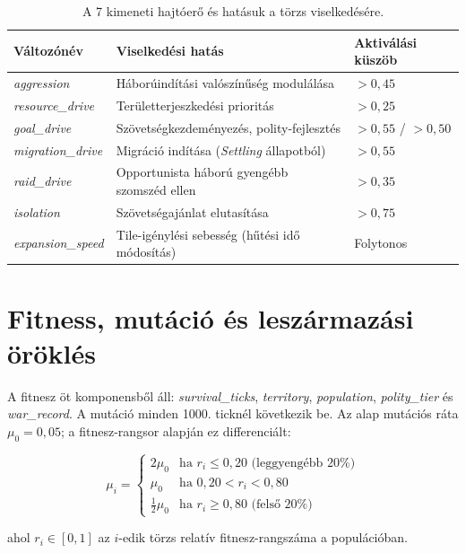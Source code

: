 \begin{table}[h]
  \centering
  \caption{A 7 kimeneti hajtóerő és hatásuk a törzs viselkedésére.}
  \label{tab:neurosim-outputs}
  \begin{tabular}{|l|l|l|}
    \hline
    \textbf{Változónév} & \textbf{Viselkedési hatás} & \textbf{Aktiválási küszöb} \\
    \hline
    \textit{aggression}      & Háborúindítási valószínűség modulálása       & $> 0{,}45$ \\
    \textit{resource\_drive} & Területterjeszkedési prioritás                & $> 0{,}25$ \\
    \textit{goal\_drive}     & Szövetségkezdeményezés, polity-fejlesztés     & $> 0{,}55$ / $> 0{,}50$ \\
    \textit{migration\_drive}& Migráció indítása (\textit{Settling} állapotból) & $> 0{,}55$ \\
    \textit{raid\_drive}     & Opportunista háború gyengébb szomszéd ellen  & $> 0{,}35$ \\
    \textit{isolation}       & Szövetségajánlat elutasítása                 & $> 0{,}75$ \\
    \textit{expansion\_speed}& Tile-igénylési sebesség (hűtési idő módosítás) & Folytonos \\
    \hline
  \end{tabular}
\end{table}

\section{Fitness, mutáció és leszármazási öröklés}

A fitnesz öt komponensből áll: \textit{survival\_ticks}, \textit{territory}, \textit{population}, \textit{polity\_tier} és \textit{war\_record}. A mutáció minden 1000. ticknél következik be. Az alap mutációs ráta $\mu_0 = 0{,}05$; a fitnesz-rangsor alapján ez differenciált:

\begin{equation}
\mu_i =
\begin{cases}
2\mu_0 & \text{ha } r_i \leq 0{,}20 \text{ (leggyengébb 20\%)} \\
\mu_0  & \text{ha } 0{,}20 < r_i < 0{,}80 \\
\tfrac{1}{2}\mu_0 & \text{ha } r_i \geq 0{,}80 \text{ (felső 20\%)}
\end{cases}
\end{equation}

ahol $r_i \in [0,1]$ az $i$-edik törzs relatív fitnesz-rangszáma a populációban.

